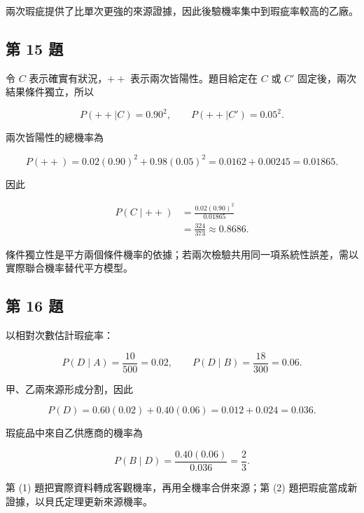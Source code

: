 \documentclass[11pt,a4paper]{article}
\begin{document}
兩次瑕疵提供了比單次更強的來源證據，因此後驗機率集中到瑕疵率較高的乙廠。

\subsection{第 15 題}\label{ux7b2c-15-ux984c}

令 \(C\) 表示確實有狀況，\(++\) 表示兩次皆陽性。題目給定在 \(C\) 或 \(C'\) 固定後，兩次結果條件獨立，所以

\[
P(++\mid C)=0.90^2,
\qquad
P(++\mid C')=0.05^2.
\]

兩次皆陽性的總機率為

\[
P(++)=0.02(0.90)^2+0.98(0.05)^2
=0.0162+0.00245
=0.01865.
\]

因此

\[
\begin{aligned}
P(C\mid ++)
&=\frac{0.02(0.90)^2}{0.01865}\\
&=\boxed{\frac{324}{373}\approx0.8686}.
\end{aligned}
\]

條件獨立性是平方兩個條件機率的依據；若兩次檢驗共用同一項系統性誤差，需以實際聯合機率替代平方模型。

\subsection{第 16 題}\label{ux7b2c-16-ux984c}

以相對次數估計瑕疵率：

\[
P(D\mid A)=\frac{10}{500}=0.02,
\qquad
P(D\mid B)=\frac{18}{300}=0.06.
\]

甲、乙兩來源形成分割，因此

\[
P(D)=0.60(0.02)+0.40(0.06)=0.012+0.024=\boxed{0.036}.
\]

瑕疵品中來自乙供應商的機率為

\[
P(B\mid D)
=\frac{0.40(0.06)}{0.036}
=\boxed{\frac23}.
\]

第 (1) 題把實際資料轉成客觀機率，再用全機率合併來源；第 (2) 題把瑕疵當成新證據，以貝氏定理更新來源機率。
\end{document}

